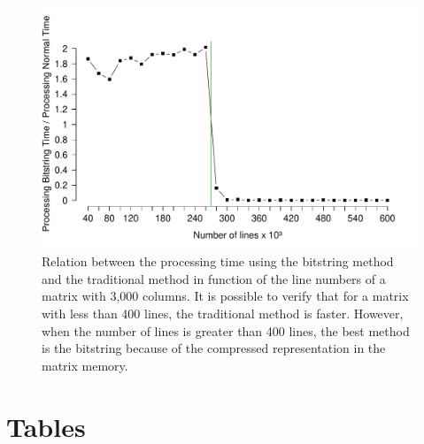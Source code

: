 \documentclass[10pt]{article}
\begin{document}
\begin{figure}[h]
  \centering
  \includegraphics[scale=0.6,clip]{fig44}
  \caption{Relation between the processing time using the bitstring method and the traditional method in function 
  of the line numbers of a matrix with 3,000 columns. It is possible to verify that for a matrix with less than 400 
  lines, the traditional method is faster. However, when the number of lines is greater  than 400 lines, the best 
  method is the bitstring because of the compressed representation in the matrix memory.}
  \label{fig44}
\end{figure}




\newpage

\clearpage

\section*{Tables}
\end{document}
